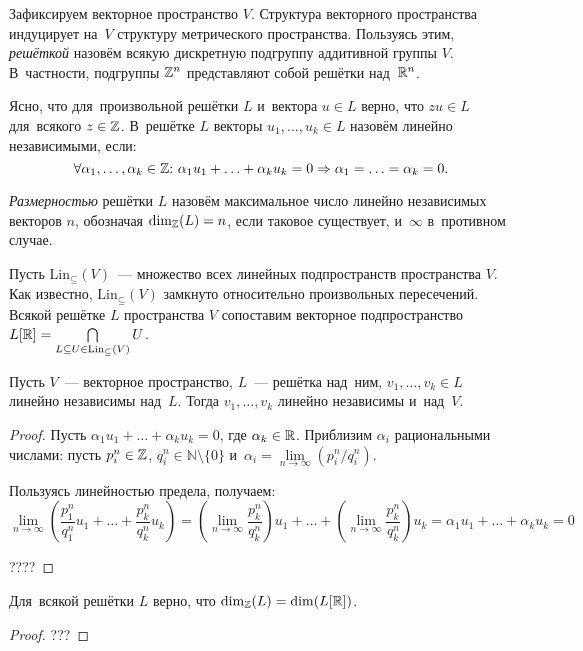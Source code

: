 \documentclass{article}
\begin{document}
Зафиксируем векторное пространство $V$. Структура векторного пространства индуцирует
на~$V$ структуру метрического пространства. Пользуясь этим, \textit{решёткой} назовём
всякую дискретную подгруппу аддитивной группы $V$.
В~частности, подгруппы $\mathbb{Z}^n$ представляют собой решётки над~$\mathbb{R}^n$.

Ясно, что для~произвольной решётки $L$ и~вектора $u \in L$ верно, что $zu \in L$ для~всякого $z \in \mathbb{Z}$.
В~решётке $L$ векторы $u_1, \ldots, u_k \in L$ назовём линейно независимыми, если:
$$
    \forall \alpha_1, \ldots, \alpha_k \in \mathbb{Z}{:}\ \alpha_1 u_1 + \ldots + \alpha_k u_k = 0 \Rightarrow \alpha_1 = \ldots = \alpha_k = 0.
$$

\textit{Размерностью} решётки $L$ назовём максимальное число линейно независимых векторов $n$, обозначая $\dim_{\mathbb{Z}}(L) = n$,
если таковое существует, и~$\infty$ в~противном случае.

Пусть $\mathrm{Lin}_{\subseteq}(V)$~— множество всех линейных подпространств пространства $V$.
Как известно, $\mathrm{Lin}_{\subseteq}(V)$ замкнуто относительно произвольных пересечений.
Всякой решётке $L$ пространства $V$ сопоставим векторное подпространство $L[\mathbb{R}] = \bigcap\limits_{L \subseteq U \in \mathrm{Lin}_{\subseteq}(V)} U$.

\begin{lemma*}
    Пусть $V$~— векторное пространство, $L$~— решётка над~ним, $v_1, \ldots, v_k \in L$ линейно независимы над~$L$.
    Тогда $v_1, \ldots, v_k$ линейно независимы и~над~$V$.
\end{lemma*}

\begin{proof}
    Пусть $\alpha_1 u_1 + \ldots + \alpha_k u_k = 0$, где $\alpha_k \in \mathbb{R}$. Приблизим $\alpha_i$ рациональными числами:
    пусть $p^n_i \in \mathbb{Z}$, $q^n_i \in \mathbb{N} \setminus \{ 0 \}$ и~$\alpha_i = \lim\limits_{n \rightarrow \infty} (p^n_i / q^n_i)$.

    Пользуясь линейностью предела, получаем:
    $$
        \lim\limits_{n \rightarrow \infty} \left( \frac{p^n_1}{q^n_1} u_1 + \ldots + \frac{p^n_k}{q^n_k} u_k \right) =
        \left( \lim\limits_{n \rightarrow \infty} \frac{p^n_k}{q^n_k} \right) u_1 + \ldots + \left( \lim\limits_{n \rightarrow \infty} \frac{p^n_k}{q^n_k} \right) u_k =
        \alpha_1 u_1 + \ldots + \alpha_k u_k = 0
    $$

    ????
\end{proof}

\begin{theorem*}
    Для~всякой решётки $L$ верно, что $\dim_{\mathbb{Z}}(L) = \dim(L[\mathbb{R}])$.
\end{theorem*}

\begin{proof}
    ???
\end{proof}
\end{document}
